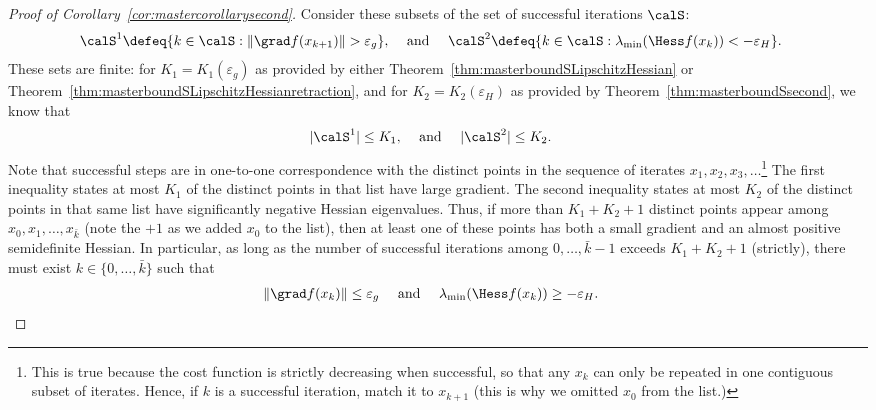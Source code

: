 \begin{proof}[Proof of Corollary~\ref{cor:mastercorollarysecond}]
	Consider these subsets of the set of successful iterations $\calS$: %
	\begin{align*}
		\calS^1 & \defeq \{k \in \calS : \|\grad f(x_{k + 1})\| > \varepsilon_g\}, & & \text{ and } & \calS^2 & \defeq \{k \in \calS : \lambda_{\min}(\Hess f(x_{k})) < - \varepsilon_{{H}}\}.
	\end{align*}
	These sets are finite: for $K_1 = K_1(\varepsilon_g)$ as provided by either Theorem~\ref{thm:masterboundSLipschitzHessian} or Theorem~\ref{thm:masterboundSLipschitzHessianretraction}, and for $K_2 = K_2(\varepsilon_{{H}})$ as provided by Theorem~\ref{thm:masterboundSsecond}, we know that
	\begin{align*}
	|\calS^1| & \leq K_1, & & \textrm{ and } & |\calS^2| & \leq K_2.
	\end{align*}
	Note that successful steps are in one-to-one correspondence with the distinct points in the sequence of iterates $x_1, x_2, x_3, \ldots$\footnote{This is true because the cost function is strictly decreasing when successful, so that any $x_k$ can only be repeated in one contiguous subset of iterates. Hence, if $k$ is a successful iteration, match it to $x_{k+1}$ (this is why we omitted $x_0$ from the list.)} The first inequality states at most $K_1$ of the distinct points in that list have large gradient. The second inequality states at most $K_2$ of the distinct points in that same list have significantly negative Hessian eigenvalues. Thus, if more than $K_1+K_2+1$ distinct points appear among $x_0, x_1, \ldots, x_{\bar k}$ (note the $+1$ as we added $x_0$ to the list),
	then at least one of these points has both a small gradient and an almost positive semidefinite Hessian.
	In particular, as long as the number of successful iterations among $0, \ldots, \bar k-1$ exceeds $K_1 + K_2 + 1$ (strictly),
	there must exist $k \in \{0, \ldots, \bar k\}$ such that
	\begin{align*}
	\|\grad f(x_{k})\| & \leq \varepsilon_g & & \text{ and } & \lambda_{\min}(\Hess f(x_{k})) & \geq - \varepsilon_{{H}}.

\end{align*}
\end{proof}
